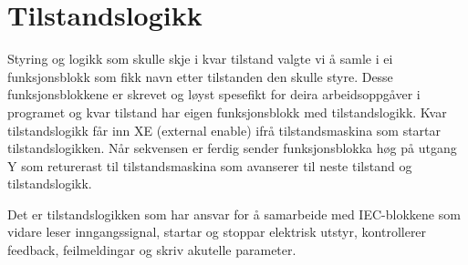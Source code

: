 \newpage
\section{Tilstandslogikk}
\thispagestyle{fancy}

Styring og logikk som skulle skje i kvar tilstand valgte vi å samle i ei funksjonsblokk som fikk navn etter tilstanden
den skulle styre. Desse funksjonsblokkene er skrevet og løyst spesefikt for deira arbeidsoppgåver i programet og kvar
tilstand har eigen funksjonsblokk med tilstandslogikk. \newline
Kvar tilstandslogikk får inn XE (external enable) ifrå tilstandsmaskina som startar tilstandslogikken. Når sekvensen er ferdig sender
funksjonsblokka høg på utgang Y som returerast til tilstandsmaskina som avanserer til neste tilstand og tilstandslogikk.

Det er tilstandslogikken som har ansvar for å samarbeide med IEC-blokkene som vidare
leser inngangssignal, startar og stoppar elektrisk utstyr, kontrollerer feedback, feilmeldingar og skriv akutelle parameter.

